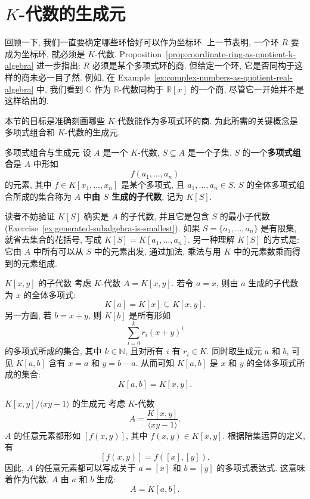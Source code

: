 \section{\texorpdfstring{$K$}{K}-代数的生成元}\label{sec:generators-of-k-algebras}

回顾一下, 我们一直要确定哪些环恰好可以作为坐标环. 上一节表明, 一个环 $R$ 要成为坐标环, 就必须是 $K$-代数. Proposition~\ref{prop:coordinate-ring-as-quotient-k-algebra} 进一步指出: $R$ 必须是某个多项式环的商. 但给定一个环, 它是否同构于这样的商未必一目了然. 例如, 在 Example~\ref{ex:complex-numbers-as-quotient-real-algebra} 中, 我们看到 $\mathbb{C}$ 作为 $\mathbb{R}$-代数同构于 $\mathbb{R}[x]$ 的一个商, 尽管它一开始并不是这样给出的.

本节的目标是准确刻画哪些 $K$-代数能作为多项式环的商. 为此所需的关键概念是多项式组合和 $K$-代数的生成元.

\begin{Definition}{多项式组合与生成元}\leavevmode\label{def:polynomial-combinations-and-generators}
  设 $A$ 是一个 $K$-代数, $S\subseteq A$ 是一个子集. $S$ 的一个\textbf{多项式组合}是 $A$ 中形如
  \[
    f(a_{1},\ldots,a_{n})
  \]
  的元素, 其中 $f\in K[x_{1},\ldots,x_{n}]$ 是某个多项式, 且 $a_{1},\ldots,a_{n}\in S$. $S$ 的全体多项式组合所成的集合称为 $A$ 中\textbf{由 $S$ 生成的子代数}, 记为 $K[S]$.
\end{Definition}

\BookPairedNote
  {读者不妨验证 $K[S]$ 确实是 $A$ 的子代数, 并且它是包含 $S$ 的最小子代数 (Exercise~\ref{ex:generated-subalgebra-is-smallest}).}
  {如果 $S=\{a_{1},\ldots,a_{n}\}$ 是有限集, 就省去集合的花括号, 写成 $K[S]=K[a_{1},\ldots,a_{n}]$.}
\noindent 另一种理解 $K[S]$ 的方式是: 它由 $A$ 中所有可以从 $S$ 中的元素出发, 通过加法, 乘法与用 $K$ 中的元素数乘而得到的元素组成.

\begin{Example}{{\textmd{$K[x,y]$} 的子代数}}\leavevmode\label{ex:subalgebras-of-two-variable-polynomials}
  考虑 $K$-代数 $A=K[x,y]$. 若令 $a=x$, 则由 $a$ 生成的子代数为 $x$ 的全体多项式:
  \[
    K[a]=K[x]\subseteq K[x,y].
  \]
  另一方面, 若 $b=x+y$, 则 $K[b]$ 是所有形如
  \[
    \sum_{i=0}^{k}r_{i}(x+y)^{i}
  \]
  的多项式所成的集合, 其中 $k\in\mathbb{N}$, 且对所有 $i$ 有 $r_{i}\in K$. 同时取生成元 $a$ 和 $b$, 可见 $K[a,b]$ 含有 $x=a$ 和 $y=b-a$. 从而可知 $K[a,b]$ 是 $x$ 和 $y$ 的全体多项式所成的集合:
  \[
    K[a,b]=K[x,y].
  \]
\end{Example}

\begin{Example}{{\textmd{$K[x,y]/\langle xy-1\rangle$} 的生成元}}\leavevmode\label{ex:generators-of-hyperbola-quotient-algebra}
  考虑 $K$-代数
  \[
    A=\frac{K[x,y]}{\langle xy-1\rangle}.
  \]
  $A$ 的任意元素都形如 $[f(x,y)]$, 其中 $f(x,y)\in K[x,y]$. 根据陪集运算的定义, 有
  \[
    [f(x,y)]=f([x],[y]).
  \]
  因此, $A$ 的任意元素都可以写成关于 $a=[x]$ 和 $b=[y]$ 的多项式表达式. 这意味着作为代数, $A$ 由 $a$ 和 $b$ 生成:
  \[
    A=K[a,b].
  \]
\end{Example}

